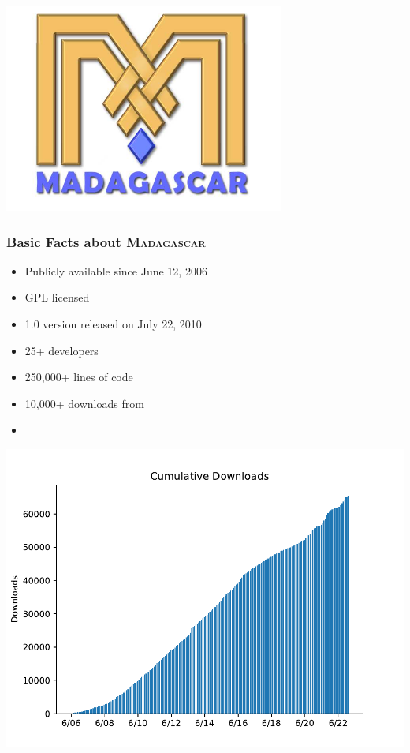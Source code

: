 \begin{frame}
  \begin{center}
 \includegraphics[height=0.25\textheight]{Fig/MadLogo} \\
 {} 
  \end{center}
\end{frame}

\begin{frame}
  \frametitle{Basic Facts about \textsc{Madagascar}}
\bfseries
  \begin{itemize} 
  \item Publicly available since June 12, 2006 
  \item GPL licensed
  \item 1.0 version released on July 22, 2010
  \item 25+ developers
  \item 250,000+ lines of code
  \item 10,000+ downloads from {}
  \item
    {}
\end{itemize}
\end{frame}

\begin{frame}
  \MadLogo
\begin{center}
\includegraphics[height=\textheight]{Pylab/Fig/downloads}  
\end{center}
\end{frame}

